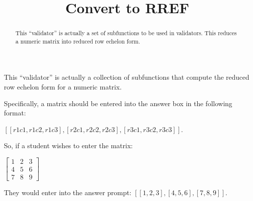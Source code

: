 \documentclass{ximera}
\title{Convert to RREF}
\begin{document}
\begin{abstract}
    This ``validator'' is actually a set of subfunctions to be used in validators. This reduces a numeric matrix into reduced row echelon form.
\end{abstract}
\maketitle

This ``validator'' is actually a collection of subfunctions that compute the reduced row echelon form for a numeric matrix. 


Specifically, a matrix should be entered into the answer box in the following format:

$[ [r1c1,r1c2,r1c3],[r2c1,r2c2,r2c3],[r3c1,r3c2,r3c3] ]$.

So, if a student wishes to enter the matrix:

$\left[\begin{matrix}
1 & 2 & 3 \\
4 & 5 & 6 \\
7 & 8 & 9
\end{matrix}\right]$

They would enter into the answer prompt: $[ [1,2,3], [4,5,6], [7,8,9] ]$.\\
\end{document}
